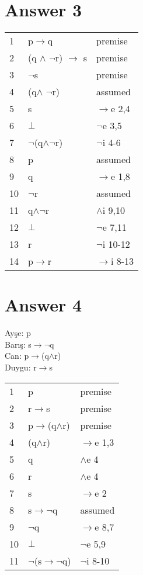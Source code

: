 \documentclass[12pt]{article}
\begin{document}
\section*{Answer 3}


\begin{table}[H]
	\centering
    
	\begin{tabular}{l l l}
		
1&p$\rightarrow$q & premise \\
2&(q $\land$ $\neg$r) $\rightarrow$ s & premise\\
3&$\neg$s& premise\\ \hline
4&(q$\land$ $\neg$r)&assumed\\
5&s&$\rightarrow$e 2,4\\
6&$\bot$&$\neg$e 3,5 \\ \hline
7&$\neg$(q$\land$$\neg$r)&$\neg$i 4-6\\ \hline
8&p&assumed\\
9&q&$\rightarrow$e 1,8\\ \hline\hline
10&$\neg$r&assumed\\
11&q$\land \neg$r&$\land$i 9,10\\
12&$\bot$&$\neg$e 7,11\\ \hline\hline
13&r&$\neg$i 10-12\\ \hline
14&p$\rightarrow$r&$\rightarrow$i 8-13


	\end{tabular}
\end{table}

\section*{Answer 4}

Ayşe: p \\
Barış: s$\rightarrow \neg$q \\
Can: p$\rightarrow$(q$\land$r)\\
Duygu: r$\rightarrow$s\\

\begin{table}[H]
	\centering
    
	\begin{tabular}{l l l}
		
1&p & premise \\
2&r$\rightarrow$s&premise\\
3&p$\rightarrow$(q$\land$r)& premise\\ 
4&(q$\land$r)&$\rightarrow$e 1,3\\
5&q&$\land$e 4\\
6&r&$\land$e 4\\
7&s&$\rightarrow$e 2\\ \hline
8&s$\rightarrow$$\neg$q&assumed\\
9&$\neg$q&$\rightarrow$e 8,7\\
10&$\bot$&$\neg$e 5,9\\ \hline
11&$\neg$(s$\rightarrow\neg$q)&$\neg$i 8-10\\

	\end{tabular}
\end{table}
\end{document}
